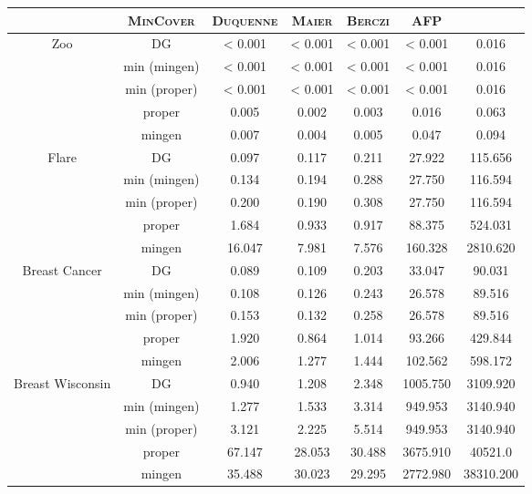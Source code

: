\begin{table}[ht]
	\centering
\begin{tabular}{| c | c || c | c | c | c | c |}
	\hline \rowcolor{clouds}
	\multicolumn{2}{c}{$\I$} & \textsc{MinCover} & \textsc{Duquenne} & \textsc{Maier} & \textsc{Berczi} & \textsc{AFP} \\ \hline
	
	\multirow{5}{*}{Zoo}
	& DG           & < 0.001 & < 0.001 & < 0.001 & < 0.001 & 0.016 \\
	& min (mingen) & < 0.001 & < 0.001 & < 0.001 & < 0.001 & 0.016 \\
	& min (proper) & < 0.001 & < 0.001 & < 0.001 & < 0.001 & 0.016 \\
	& proper       & 0.005   & 0.002   & 0.003   & 0.016   & 0.063 \\
	& mingen       & 0.007   & 0.004   & 0.005   & 0.047   & 0.094 \\ \hline
	
	\multirow{5}{*}{Flare}
	& DG           & 0.097 & 0.117 & 0.211 & 27.922 & 115.656 \\
	& min (mingen) & 0.134 & 0.194 & 0.288 & 27.750 & 116.594 \\
	& min (proper) & 0.200 & 0.190 & 0.308 & 27.750 & 116.594 \\
	& proper       & 1.684 & 0.933 & 0.917 & 88.375 & 524.031 \\
	& mingen       & 16.047 & 7.981 & 7.576 & 160.328 & 2810.620 \\ \hline
	
	\multirow{5}{*}{Breast Cancer}
	& DG           & 0.089 & 0.109 & 0.203 & 33.047 & 90.031 \\
	& min (mingen) & 0.108 & 0.126 & 0.243 & 26.578 & 89.516 \\
	& min (proper) & 0.153 & 0.132 & 0.258 & 26.578 & 89.516 \\
	& proper       & 1.920 & 0.864 & 1.014 & 93.266 & 429.844 \\
	& mingen       & 2.006 & 1.277 & 1.444 & 102.562 & 598.172 \\ \hline
	
	\multirow{5}{*}{Breast Wisconsin} 
	& DG           & 0.940 & 1.208 & 2.348 & 1005.750 & 3109.920 \\
	& min (mingen) & 1.277 & 1.533 & 3.314 & 949.953 & 3140.940 \\
	& min (proper) & 3.121 & 2.225 & 5.514 & 949.953 & 3140.940 \\
	& proper       & 67.147 & 28.053 & 30.488 & 3675.910 & 40521.0 \\
	& mingen       & 35.488 & 30.023 & 29.295 & 2772.980 & 38310.200 \\ \hline
	

\end{tabular}
\end{table}
